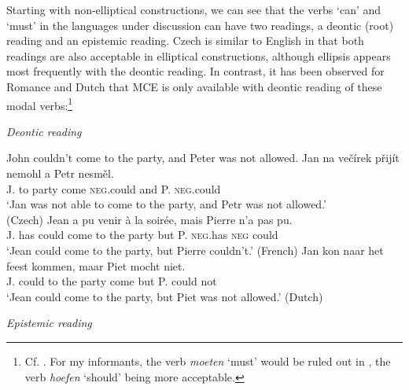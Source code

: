 \documentclass[output=paper,colorlinks,citecolor=brown,
modfonts
]{langscibook}
\begin{document}
Starting with non-elliptical constructions, we can see that the verbs `can' and `must' in the languages under discussion can have two readings, a deontic (root) reading and an epistemic reading. Czech is similar to English in that both readings are also acceptable in elliptical constructions, although ellipsis appears most frequently with the deontic reading. In contrast, it has been observed for Romance and Dutch that MCE is only available with deontic reading of these modal verbs:\footnote{Cf. \cite{Barbiers1995,Lobeck1995,Aelbrecht2008}. For my informants, the verb \textit{moeten} ‘must’ would be ruled out in , the verb \textit{hoefen} ‘should’ being more acceptable.}

\begin{exe}
\ex	\textit{Deontic reading}\label{18}
\begin{xlist}
\ex\label{18a} John couldn't come to the party, and Peter was not allowed. 
\ex \label{18b}
\gll  Jan na večírek přijít  nemohl    a    Petr  nesměl.\\
J.    to  party    come \textsc{neg}.could  and P.     \textsc{neg}.could\\
\glt `Jan was not able to come to the party, and Petr was not allowed.' \\ { } \hfill (Czech)
\ex \label{18c} 
\gll  Jean a   pu venir  à  la soirée,  mais Pierre n'a  pas  pu. \\
J.  has could come to the party  but   P. {\textsc{neg}.has} \textsc{neg} could\\
\glt `Jean could come to the party, but Pierre couldn't.' \hfill  (French)
\ex\label{18d} 
\gll  Jan kon    naar het feest kommen, maar Piet mocht niet. \\
 J.   could to     the party come      but     P.    could   not\\
 \glt `Jean could come to the party, but Piet was not allowed.' \hfill (Dutch)
\end{xlist}

\ex \textit{Epistemic reading}\label{19}
\begin{xlist}
\end{xlist}
\end{exe}
\end{document}
